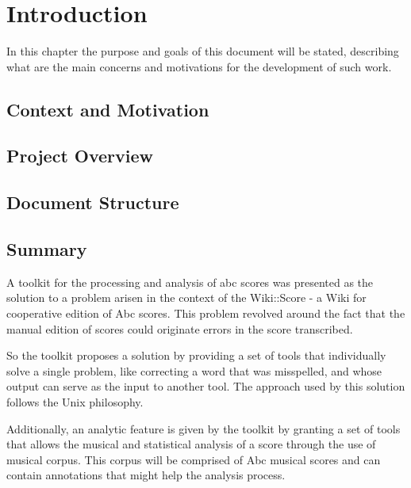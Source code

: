 \documentclass[main.tex]{subfiles}
\begin{document}
\chapter{Introduction}

In this chapter the purpose and goals of this document will be stated, describing what are the main
concerns and motivations for the development of such work.

\section{Context and Motivation}


\section{Project Overview}


\section{Document Structure}



\section{Summary}

A toolkit for the processing and analysis of abc scores was presented as the solution to a problem
arisen in the context of the Wiki::Score - a Wiki for cooperative edition of Abc scores. This
problem revolved around the fact that the manual edition of scores could originate errors in the
score transcribed.

So the toolkit proposes a solution by providing a set of tools that individually solve a single
problem, like correcting a word that was misspelled, and whose output can serve as the input to
another tool. The approach used by this solution follows the Unix philosophy.

Additionally, an analytic feature is given by the toolkit by granting a set of tools that allows the
musical and statistical analysis of a score through the use of musical corpus. This corpus will be
comprised of Abc musical scores and can contain annotations that might help the analysis process.
\end{document}
